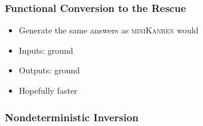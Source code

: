 \documentclass[xcolor=table, aspectratio=169]{beamer}
\newcommand{\mk}{\textsc{miniKanren}\xspace}
\begin{document}
\begin{frame}[fragile]
  \frametitle{Functional Conversion to the Rescue}

\begin{center}
  
\end{center}

\vfill

\begin{center}
  \begin{minipage}{0.4\textwidth}
    \begin{itemize}
      \item Generate the same answers as \mk would
      \item Inputs: ground 
      \item Outputs: ground 
      \item Hopefully faster
    \end{itemize}
  \end{minipage}
\end{center}

\end{frame}


\begin{frame}[fragile]
  \frametitle{Nondeterministic Inversion}

\end{frame}
\end{document}
